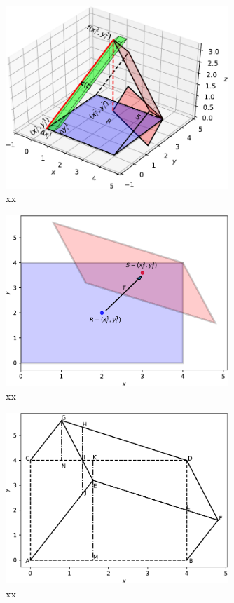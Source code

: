 \documentclass{article}
\theoremstyle{theorem}
\theoremstyle{definition}
\begin{document}
\begin{figure}[htb]
\centering
\includegraphics[width=0.75\textwidth]{prismatoid_solid.pdf}
\caption{xx}
\label{fig:prismatoid_solid}
\end{figure}

\begin{figure}[htb]
\centering
\includegraphics[width=0.75\textwidth]{prismatoid_regions.pdf}
\caption{xx}
\label{fig:prismatoid_regions}
\end{figure}

\begin{figure}[htb]
\centering
\includegraphics[width=0.75\textwidth]{prismatoid_xy.pdf}
\caption{xx}
\label{fig:prismatoid_xy}
\end{figure}
\end{document}
